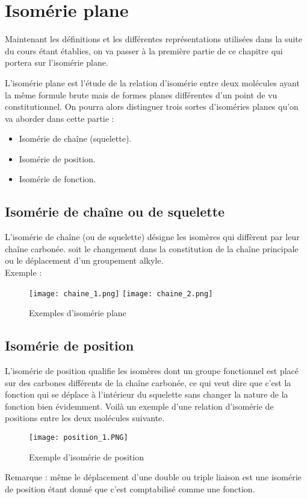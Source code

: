 \documentclass[a4paper, oneside]{book}
\begin{document}
\chapter{Isomérie plane}
\minitoc
Maintenant les définitions et les différentes représentations utilisées dans la suite du cours étant établies, on va passer à la première partie de ce chapitre qui portera sur l'isomérie plane.

L'isomérie plane est l'étude de la relation d'isomérie entre deux molécules ayant la même formule brute mais de formes planes différentes d'un point de vu constitutionnel. On pourra alors distinguer trois sortes d'isoméries planes qu'on va aborder dans cette partie :\\
\begin{itemize}
    \item Isomérie de chaîne (squelette).
    \item Isomérie de position.
    \item Isomérie de fonction.
\end{itemize}
\section{Isomérie de chaîne ou de squelette}
L'isomérie de chaîne (ou de squelette) désigne les isomères qui diffèrent par leur chaîne carbonée. soit le changement dans la constitution de la chaîne principale ou le déplacement d'un groupement alkyle.\\
Exemple : 
\begin{figure}[!h]
    \centering
    \texttt{[image: chaine\_1.png]}
    \texttt{[image: chaine\_2.png]}
    \caption{Exemples d'isomérie plane}
    \label{fig:my_label}
\end{figure}
\section{Isomérie de position}
L'isomérie de position qualifie les isomères dont un groupe fonctionnel est placé sur des carbones différents de la chaîne carbonée, ce qui veut dire que c'est la fonction qui se déplace à l'intérieur du squelette sans changer la nature de la fonction bien évidemment. Voilà un exemple d'une relation d'isomérie de positions entre les deux molécules suivante.
\begin{figure}[!h]
    \centering
    \texttt{[image: position\_1.PNG]}
    \caption{Exemple d'isomérie de position}
    \label{fig:my_label}
\end{figure}
Remarque : même le déplacement d'une double ou triple liaison est une isomérie de position étant donné que c'est comptabilisé comme une fonction.
\end{document}
